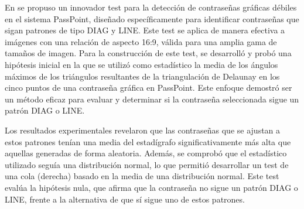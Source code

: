 \documentclass[12pt]{report}
\begin{document}


En \cite{13} se propuso un innovador test para la detección de contraseñas gráficas débiles en el sistema PassPoint, diseñado específicamente para identificar contraseñas que sigan patrones de tipo DIAG y LINE. Este test se aplica de manera efectiva a imágenes con una relación de aspecto 16:9, válida para una amplia gama de tamaños de imagen. Para la construcción de este test, se desarrolló y probó una hipótesis inicial en la que se utilizó como estadístico la media de los ángulos máximos de los triángulos resultantes de la triangulación de Delaunay en los cinco puntos de una contraseña gráfica en PassPoint. Este enfoque demostró ser un método eficaz para evaluar y determinar si la contraseña seleccionada sigue un patrón DIAG o LINE.

Los resultados experimentales revelaron que las contraseñas que se ajustan a estos patrones tenían una media del estadígrafo significativamente más alta que aquellas generadas de forma aleatoria. Además, se comprobó que el estadístico utilizado seguía una distribución normal, lo que permitió desarrollar un test de una cola (derecha) basado en la media de una distribución normal. Este test evalúa la hipótesis nula, que afirma que la contraseña no sigue un patrón DIAG o LINE, frente a la alternativa de que sí sigue uno de estos patrones.
\end{document}
